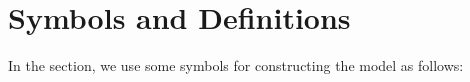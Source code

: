 \section{Symbols and Definitions }
In the section, we use some symbols for constructing the model as follows: 



